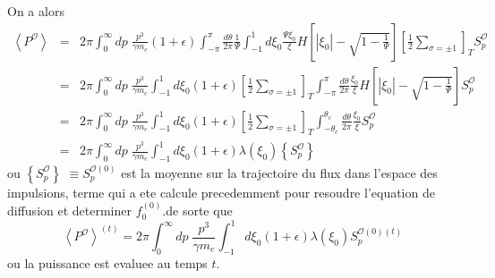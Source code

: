 On a alors \begin{eqnarray*}
\left\langle P^{\mathcal{O}}\right\rangle  & = & 2\pi\int_{0}^{\infty}dp\;\frac{p^{3}}{\gamma m_{e}}(1+\epsilon)\int_{-\pi}^{\pi}\frac{d\theta}{2\pi}\frac{1}{\Psi}\int_{-1}^{1}d\xi_{0}\frac{\Psi\xi_{0}}{\xi}H\left[\left|\xi_{0}\right|-\sqrt{1-\frac{1}{\Psi}}\right]\left[\frac{1}{2}\sum_{\sigma=\pm1}\right]_{T}S_{p}^{\mathcal{O}}\\
 & = & 2\pi\int_{0}^{\infty}dp\;\frac{p^{3}}{\gamma m_{e}}\int_{-1}^{1}d\xi_{0}(1+\epsilon)\left[\frac{1}{2}\sum_{\sigma=\pm1}\right]_{T}\int_{-\pi}^{\pi}\frac{d\theta}{2\pi}\frac{\xi_{0}}{\xi}H\left[\left|\xi_{0}\right|-\sqrt{1-\frac{1}{\Psi}}\right]S_{p}^{\mathcal{O}}\\
 & = & 2\pi\int_{0}^{\infty}dp\;\frac{p^{3}}{\gamma m_{e}}\int_{-1}^{1}d\xi_{0}(1+\epsilon)\left[\frac{1}{2}\sum_{\sigma=\pm1}\right]_{T}\int_{-\theta_{c}}^{\theta_{c}}\frac{d\theta}{2\pi}\frac{\xi_{0}}{\xi}S_{p}^{\mathcal{O}}\\
 & = & 2\pi\int_{0}^{\infty}dp\;\frac{p^{3}}{\gamma m_{e}}\int_{-1}^{1}d\xi_{0}(1+\epsilon)\lambda\left(\xi_{0}\right)\left\{ S_{p}^{\mathcal{O}}\right\} \end{eqnarray*}
 ou $\left\{ S_{p}^{\mathcal{O}}\right\} $ $\equiv S_{p}^{\mathcal{O}(0)}$
est la moyenne sur la trajectoire du flux dans l'espace des impulsions,
terme qui a ete calcule precedemment pour resoudre l'equation de diffusion
et determiner $f_{0}^{(0)}.$de sorte que \[
\left\langle P^{\mathcal{O}}\right\rangle ^{(t)}=2\pi\int_{0}^{\infty}dp\;\frac{p^{3}}{\gamma m_{e}}\int_{-1}^{1}d\xi_{0}(1+\epsilon)\lambda\left(\xi_{0}\right)S_{p}^{\mathcal{O}(0)(t)}\]
 ou la puissance est evaluee au temps $t$.

